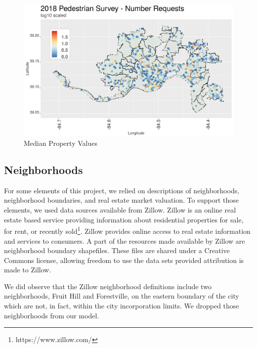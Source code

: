 \documentclass{llncs}
\begin{document}
%

\FloatBarrier
\begin{figure}
 	\includegraphics[width=\textwidth, height=\textheight, keepaspectratio]{pedestrianSurveyNRequests}
 	\caption{Median Property Values}
	\label{figure : pedestrianSurveyNRequests}
\end{figure}
\FloatBarrier


\subsection{Neighborhoods}

For some elements of this project, we relied on descriptions of neighborhoods, neighborhood boundaries, and real estate market valuation. To support those elements, we used data sources available from Zillow. Zillow is an online real estate based service providing information about residential properties for sale, for rent, or recently sold\footnote{https://www.zillow.com/}. Zillow provides online access to real estate information and services to consumers. A part of the resources made available by Zillow are neighborhood boundary shapefiles. These files are shared under a Creative Commons license, allowing freedom to use the data sets provided attribution is made to Zillow.

We did observe that the Zillow neighborhood definitions include two neighborhoods, Fruit Hill and Forestville, on the eastern boundary of the city which are not, in fact, within the city incorporation limits. We dropped those neighborhoods from our model.
\end{document}
